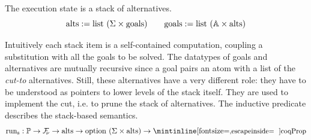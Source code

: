 \documentclass[sigplan,10pt,anonymous,review]{acmart}
\begin{document}

The execution state is a stack of alternatives.
%
$$\mathrm{alts} := \mathrm{list}\ (\Sigma \times \mathrm{goals})  \qquad \mathrm{goals} := \mathrm{list}\ (\mathbb{A} \times \mathrm{alts})$$

Intuitively each stack item is a self-contained
computation, coupling a substitution with all the goals to be
solved.
%
The datatypes of goals and alternatives are mutually recursive since
a goal pairs an atom with a list of the \emph{cut-to} alternatives. 
Still, these alternatives have a very different role: they have to be understood
as pointers to lower levels of the stack itself.
They are used to implement the cut, i.e. to prune the stack of alternatives.
The \nur inductive
predicate describes
the stack-based semantics.
%
\newcommand{\backchainS}{
  \ensuremath{\mathcal{B}_S}
}
%
%
%
$$\nur : \mathbb{P} \to \FV \to \mathrm{alts} \to \mathrm{option}\ (\Sigma \times \mathrm{alts}) \to \cI{Prop}$$
\end{document}
